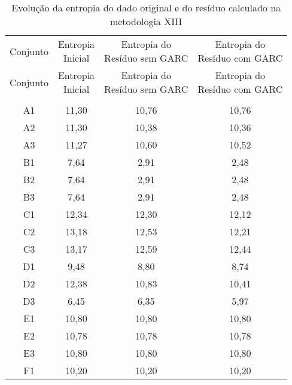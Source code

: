 \clearpage

\begin{center}
\begin{longtable}{cccc}
\toprule
\rowcolor{white}
\caption[Metodologia XIII: evolução da entropia]{Evolução da entropia do dado
original e do resíduo calculado na metodologia XIII}
\label{tab:EvolucaoEntropiaMet13}\\
\midrule
Conjunto & \specialcell{Entropia \\Inicial} & \specialcell{Entropia do
\\Resíduo sem GARC} & \specialcell{Entropia do
\\Resíduo com GARC}  \\
\midrule
\endfirsthead
\midrule
\rowcolor{white}
Conjunto & \specialcell{Entropia \\Inicial} & \specialcell{Entropia do
\\Resíduo sem GARC} & \specialcell{Entropia do
\\Resíduo com GARC}  \\
\toprule
\endhead
\midrule \\ %
\endfoot
\bottomrule 
\endlastfoot
    A1    & 11,30 & 10,76 & 10,76 \\
    A2    & 11,30 & 10,38 & 10,36 \\
    A3    & 11,27 & 10,60 & 10,52 \\
    B1    & 7,64  & 2,91  & 2,48 \\
    B2    & 7,64  & 2,91  & 2,48 \\
    B3    & 7,64  & 2,91  & 2,48 \\
    C1    & 12,34 & 12,30 & 12,12 \\
    C2    & 13,18 & 12,53 & 12,21 \\
    C3    & 13,17 & 12,59 & 12,44 \\
    D1    & 9,48  & 8,80  & 8,74 \\
    D2    & 12,38 & 10,83 & 10,41 \\
    D3    & 6,45  & 6,35  & 5,97 \\
    E1    & 10,80 & 10,80 & 10,80 \\
    E2    & 10,78 & 10,78 & 10,78 \\
    E3    & 10,80 & 10,80 & 10,80 \\
    F1    & 10,20 & 10,20 & 10,20 \\

\end{longtable}
\end{center}
